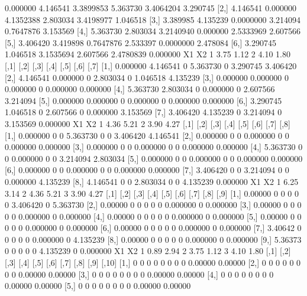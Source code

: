 \documentclass[a4paper, 12pt]{article}
\begin{document}
\begin{itemize}
\begin{Schunk}
\begin{Soutput}
         [,1]     [,2]      [,3]     [,4]      [,5]     [,6]
[1,] 0.000000 4.146541 3.3899853 5.363730 3.4064204 3.290745
[2,] 4.146541 0.000000 4.1352388 2.803034 3.4198977 1.046518
[3,] 3.389985 4.135239 0.0000000 3.214094 0.7647876 3.153569
[4,] 5.363730 2.803034 3.2140940 0.000000 2.5333969 2.607566
[5,] 3.406420 3.419898 0.7647876 2.533397 0.0000000 2.478084
[6,] 3.290745 1.046518 3.1535694 2.607566 2.4780839 0.000000
    X1   X2
1 3.75 1.12
2 4.10 1.80
         [,1]     [,2] [,3]     [,4] [,5]     [,6]     [,7]
[1,] 0.000000 4.146541    0 5.363730    0 3.290745 3.406420
[2,] 4.146541 0.000000    0 2.803034    0 1.046518 4.135239
[3,] 0.000000 0.000000    0 0.000000    0 0.000000 0.000000
[4,] 5.363730 2.803034    0 0.000000    0 2.607566 3.214094
[5,] 0.000000 0.000000    0 0.000000    0 0.000000 0.000000
[6,] 3.290745 1.046518    0 2.607566    0 0.000000 3.153569
[7,] 3.406420 4.135239    0 3.214094    0 3.153569 0.000000
    X1   X2
1 4.36 5.21
2 3.90 4.27
         [,1] [,2] [,3]     [,4] [,5] [,6]     [,7]     [,8]
[1,] 0.000000    0    0 5.363730    0    0 3.406420 4.146541
[2,] 0.000000    0    0 0.000000    0    0 0.000000 0.000000
[3,] 0.000000    0    0 0.000000    0    0 0.000000 0.000000
[4,] 5.363730    0    0 0.000000    0    0 3.214094 2.803034
[5,] 0.000000    0    0 0.000000    0    0 0.000000 0.000000
[6,] 0.000000    0    0 0.000000    0    0 0.000000 0.000000
[7,] 3.406420    0    0 3.214094    0    0 0.000000 4.135239
[8,] 4.146541    0    0 2.803034    0    0 4.135239 0.000000
    X1   X2
1 6.25 3.14
2 4.36 5.21
3 3.90 4.27
         [,1] [,2] [,3] [,4] [,5] [,6]     [,7] [,8]     [,9]
 [1,] 0.00000    0    0    0    0    0 3.406420    0 5.363730
 [2,] 0.00000    0    0    0    0    0 0.000000    0 0.000000
 [3,] 0.00000    0    0    0    0    0 0.000000    0 0.000000
 [4,] 0.00000    0    0    0    0    0 0.000000    0 0.000000
 [5,] 0.00000    0    0    0    0    0 0.000000    0 0.000000
 [6,] 0.00000    0    0    0    0    0 0.000000    0 0.000000
 [7,] 3.40642    0    0    0    0    0 0.000000    0 4.135239
 [8,] 0.00000    0    0    0    0    0 0.000000    0 0.000000
 [9,] 5.36373    0    0    0    0    0 4.135239    0 0.000000
    X1   X2
1 0.89 2.94
2 3.75 1.12
3 4.10 1.80
      [,1] [,2] [,3] [,4] [,5] [,6] [,7] [,8]    [,9]   [,10]
 [1,]    0    0    0    0    0    0    0    0 0.00000 0.00000
 [2,]    0    0    0    0    0    0    0    0 0.00000 0.00000
 [3,]    0    0    0    0    0    0    0    0 0.00000 0.00000
 [4,]    0    0    0    0    0    0    0    0 0.00000 0.00000
 [5,]    0    0    0    0    0    0    0    0 0.00000 0.00000

\end{Soutput}
\end{Schunk}
\end{itemize}
\end{document}
